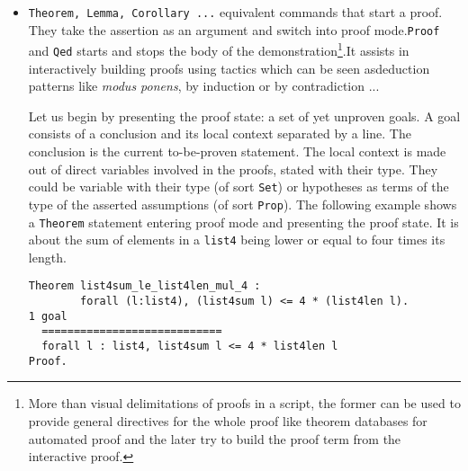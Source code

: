 \documentclass{article}
\newcounter{example}[section]
\begin{document}
\begin{itemize}
            \item \texttt{Theorem, Lemma, Corollary ...} equivalent commands that start a proof. They take the assertion as an argument and switch into proof mode.\texttt{Proof} and \texttt{Qed} starts and stops the body of the demonstration\footnote{More than visual delimitations of proofs in a script, the former can be used to provide general directives for the whole proof like theorem databases for automated proof and the later try to build the proof term from the interactive proof.}.It assists in interactively building proofs using tactics which can be seen asdeduction patterns like \textit{modus ponens}, by induction or by contradiction ...\par Let us begin by presenting the proof state: a set of yet unproven goals. A goal consists of a conclusion and its local context separated by a line. The conclusion is the current to-be-proven statement. The local context is made out of direct variables involved in the proofs, stated with their type. They could be variable with their type (of sort \texttt{Set}) or hypotheses as terms of the type of the asserted assumptions (of sort \texttt{Prop}). The following example shows a \texttt{Theorem} statement entering proof mode and presenting the proof state. It is about the sum of elements in a \texttt{list4} being lower or equal to four times its length.
            \begin{verbatim}Theorem list4sum_le_list4len_mul_4 : 
        forall (l:list4), (list4sum l) <= 4 * (list4len l).
1 goal
  ============================
  forall l : list4, list4sum l <= 4 * list4len l
Proof.\end{verbatim}
            
        \end{itemize}
\end{document}
